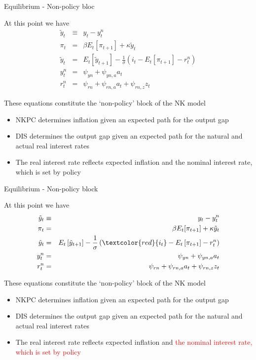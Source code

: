 \documentclass{beamer}
\begin{document}
\begin{frame}{Equilibrium - Non-policy bloc}

At this point we have
\begin{eqnarray}
\tilde{y}_{t} &\equiv&	 y_{t} - y^{n}_{t}							\\
\pi_{t}		&=& 		\beta E_{t}[ \pi_{t+1} ] + \kappa \tilde{y}_{t}	\\
\tilde{y}_{t} &=& 		E_{t} \left[ \tilde{y}_{t+1} \right] - \frac{1}{\sigma} \left(i_{t} - E_{t}\left[ \pi_{t+1} \right]  - r^{n}_{t} \right)														\\
y^{n}_{t}	&=&		\psi_{yn} + \psi_{yn,a} a_{t}					\\
r^{n}_{t}	&=&		\psi_{rn} + \psi_{rn,a} a_{t} + \psi_{rn,z} z_{t}
\end{eqnarray}

These equations constitute the `non-policy' block of the NK model
\begin{itemize}
\item	NKPC determines inflation given an expected path for the output gap
\item	DIS determines the output gap given an expected path for the natural and actual real interest rates
\item	The real interest rate reflects expected inflation and the nominal interest rate, which is set by policy
\end{itemize}

\end{frame}


	
\begin{frame}{Equilibrium - Non-policy block}

At this point we have
\begin{eqnarray}
\tilde{y}_{t} &\equiv&	 y_{t} - y^{n}_{t}							\\
\pi_{t}		&=& 		\beta E_{t}[ \pi_{t+1} ] + \kappa \tilde{y}_{t}	\\
\tilde{y}_{t} &=& 		E_{t} \left[ \tilde{y}_{t+1} \right] - \frac{1}{\sigma} \left(\textcolor{red}{i_{t}} - E_{t}\left[ \pi_{t+1} \right]  - r^{n}_{t} \right)														\\
y^{n}_{t}	&=&		\psi_{yn} + \psi_{yn,a} a_{t}					\\
r^{n}_{t}	&=&		\psi_{rn} + \psi_{rn,a} a_{t} + \psi_{rn,z} z_{t}
\end{eqnarray}

These equations constitute the `non-policy' block of the NK model
\begin{itemize}
\item	NKPC determines inflation given an expected path for the output gap
\item	DIS determines the output gap given an expected path for the natural and actual real interest rates
\item	The real interest rate reflects expected inflation and \textcolor{red}{the nominal interest rate, which is set by policy}
\end{itemize}

\end{frame}
\end{document}
